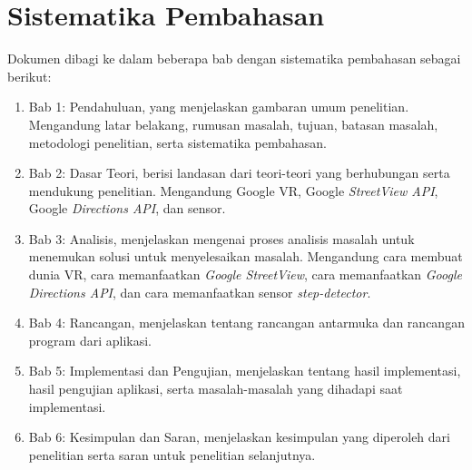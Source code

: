 \section{Sistematika Pembahasan}
\label{sec:sispem}
Dokumen dibagi ke dalam beberapa bab dengan sistematika pembahasan sebagai berikut:
\begin{enumerate}
	\item Bab 1: Pendahuluan, yang menjelaskan gambaran umum penelitian. Mengandung latar belakang, rumusan masalah, tujuan, batasan masalah, metodologi penelitian, serta sistematika pembahasan.
	\item Bab 2: Dasar Teori, berisi landasan dari teori-teori yang berhubungan serta mendukung penelitian. Mengandung Google VR, Google {\it StreetView API}, Google {\it Directions API}, dan sensor.
	\item Bab 3: Analisis, menjelaskan mengenai proses analisis masalah untuk menemukan solusi untuk menyelesaikan masalah. Mengandung cara membuat dunia VR, cara memanfaatkan \textit{Google StreetView}, cara memanfaatkan \textit{Google Directions API}, dan cara memanfaatkan sensor \textit{step-detector}. 
	\item Bab 4: Rancangan, menjelaskan tentang rancangan antarmuka dan rancangan program dari aplikasi.
	\item Bab 5: Implementasi dan Pengujian, menjelaskan tentang hasil implementasi, hasil pengujian aplikasi, serta masalah-masalah yang dihadapi saat implementasi.
	\item Bab 6: Kesimpulan dan Saran, menjelaskan kesimpulan yang diperoleh dari penelitian serta saran  untuk penelitian selanjutnya.
\end{enumerate}
